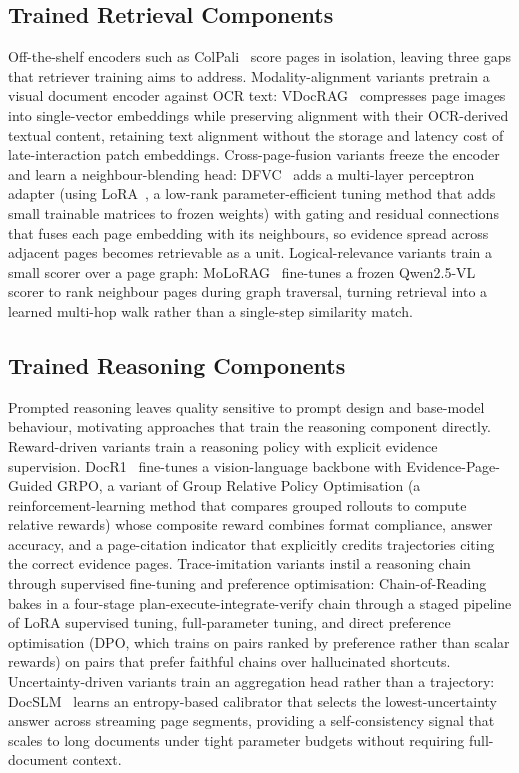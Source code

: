 \documentclass[11pt]{article}
\begin{document}
\subsection{Trained Retrieval Components}
\label{sec:train-retrieval}

Off-the-shelf encoders such as ColPali~\cite{faysse2024colpali} score pages in isolation, leaving three gaps that retriever training aims to address. Modality-alignment variants pretrain a visual document encoder against OCR text: VDocRAG~\cite{tanaka2025vdocrag} compresses page images into single-vector embeddings while preserving alignment with their OCR-derived textual content, retaining text alignment without the storage and latency cost of late-interaction patch embeddings. Cross-page-fusion variants freeze the encoder and learn a neighbour-blending head: DFVC~\cite{qian2026accurate} adds a multi-layer perceptron adapter (using LoRA~\cite{hu2022lora}, a low-rank parameter-efficient tuning method that adds small trainable matrices to frozen weights) with gating and residual connections that fuses each page embedding with its neighbours, so evidence spread across adjacent pages becomes retrievable as a unit. Logical-relevance variants train a small scorer over a page graph: MoLoRAG~\cite{wu2025molorag} fine-tunes a frozen Qwen2.5-VL scorer to rank neighbour pages during graph traversal, turning retrieval into a learned multi-hop walk rather than a single-step similarity match.

\subsection{Trained Reasoning Components}
\label{sec:train-reasoning}

Prompted reasoning leaves quality sensitive to prompt design and base-model behaviour, motivating approaches that train the reasoning component directly. Reward-driven variants train a reasoning policy with explicit evidence supervision. DocR1~\cite{xiong2026docr1} fine-tunes a vision-language backbone with Evidence-Page-Guided GRPO, a variant of Group Relative Policy Optimisation (a reinforcement-learning method that compares grouped rollouts to compute relative rewards) whose composite reward combines format compliance, answer accuracy, and a page-citation indicator that explicitly credits trajectories citing the correct evidence pages. Trace-imitation variants instil a reasoning chain through supervised fine-tuning and preference optimisation: Chain-of-Reading~\cite{guo2026endtoend} bakes in a four-stage plan-execute-integrate-verify chain through a staged pipeline of LoRA supervised tuning, full-parameter tuning, and direct preference optimisation (DPO, which trains on pairs ranked by preference rather than scalar rewards) on pairs that prefer faithful chains over hallucinated shortcuts. Uncertainty-driven variants train an aggregation head rather than a trajectory: DocSLM~\cite{hannan2025docslm} learns an entropy-based calibrator that selects the lowest-uncertainty answer across streaming page segments, providing a self-consistency signal that scales to long documents under tight parameter budgets without requiring full-document context.
\end{document}
